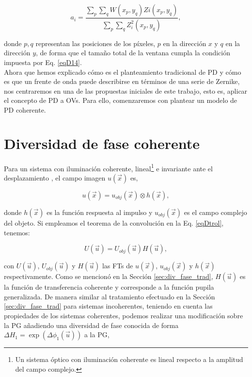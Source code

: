 \begin{equation}
\label{eqD22}
	a_i = \frac{\sum\limits_p \sum\limits_q W(x_p,y_q) Zi(x_p,y_q)}{\sum\limits_p \sum\limits_q Z_i^2(x_p,y_q)} ,
\end{equation}

donde $p, q$ representan las posiciones de los píxeles, $p$ en la dirección $x$ y $q$ en la dirección $y$, de forma que el tamaño total de la ventana cumpla la condición impuesta por Eq. \ref{eqD14}.\\

Ahora que hemos explicado cómo es el planteamiento tradicional de PD y cómo es que un frente de onda puede describirse en términos de una serie de Zernike, nos centraremos en una de las propuestas iniciales de este trabajo, esto es, aplicar el concepto de PD a OVs. Para ello, comenzaremos con plantear un modelo de PD coherente.

\section{Diversidad de fase coherente}
\label{sec:PD_coherente}

Para un sistema con iluminación coherente, lineal\footnote{Un sistema óptico con iluminación coherente es lineal respecto a la amplitud del campo complejo.} e invariante ante el desplazamiento \cite{Goodman2005}, el campo imagen $u(\vec{x})$ es,

\begin{equation}
\label{eqDtrol}
	u(\vec{x}) = u_{obj}(\vec{x}) \otimes h(\vec{x}),
\end{equation}
%
%

donde $h(\vec{x})$ es la función respuesta al impulso y $u_{obj}(\vec{x})$ es el campo complejo del objeto. Si empleamos el teorema de la convolución en la Eq. \ref{eqDtrol}, tenemos:

\begin{equation}
\label{eqD24}
	U(\vec{u}) = U_{obj}(\vec{u}) H(\vec{u}),
\end{equation}

con $U(\vec{u})$, $U_{obj}(\vec{u})$ y $H(\vec{u})$ las FTs de $u(\vec{x})$, $u_{obj}(\vec{x})$ y $h(\vec{x})$ respectivamente. Como se mencionó en la Sección \ref{sec:div_fase_trad}, $H(\vec{u})$ es la función de transferencia coherente y corresponde a la función pupila generalizada. De manera similar al tratamiento efectuado en la Sección \ref{sec:div_fase_trad} para sistemas incoherentes, teniendo en cuenta las propiedades de los sistemas coherentes, podemos realizar una modificación sobre la PG añadiendo una diversidad de fase conocida de forma $\Delta H_1 = \exp (\Delta \phi_1 (\vec{u}))$ a la PG,

